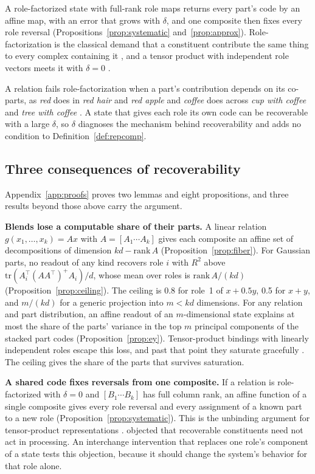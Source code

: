 \documentclass[10pt]{article}
\theoremstyle{plain}
\theoremstyle{remark}
\begin{document}
A role-factorized state with full-rank role maps returns every part's code by an affine map, with an error that grows with $\delta$, and one composite then fixes every role reversal (Propositions~\ref{prop:systematic} and~\ref{prop:approx}). Role-factorization is the classical demand that a constituent contribute the same thing to every complex containing it \citep{fodor1988}, and a tensor product with independent role vectors meets it with $\delta = 0$ \citep{smolensky1990}.

A relation fails role-factorization when a part's contribution depends on its co-parts, as \emph{red} does in \emph{red hair} and \emph{red apple} \citep{kamp1995} and \emph{coffee} does across \emph{cup with coffee} and \emph{tree with coffee} \citep{smolensky1988}. A state that gives each role its own code can be recoverable with a large $\delta$, so $\delta$ diagnoses the mechanism behind recoverability and adds no condition to Definition~\ref{def:repcomp}.

\subsection{Three consequences of recoverability}
\label{sec:consequences}

Appendix~\ref{app:proofs} proves two lemmas and eight propositions, and three results beyond those above carry the argument.

\textbf{Blends lose a computable share of their parts.} A linear relation $g(x_1, \ldots, x_k) = A x$ with $A = [A_1 \cdots A_k]$ gives each composite an affine set of decompositions of dimension $kd - \mathrm{rank}\,A$ (Proposition~\ref{prop:fiber}). For Gaussian parts, no readout of any kind recovers role $i$ with $R^2$ above $\mathrm{tr}(A_i^{\top}(AA^{\top})^{+}A_i)/d$, whose mean over roles is $\mathrm{rank}\,A/(kd)$ (Proposition~\ref{prop:ceiling}). The ceiling is 0.8 for role~1 of $x + 0.5y$, 0.5 for $x + y$, and $m/(kd)$ for a generic projection into $m < kd$ dimensions. For any relation and part distribution, an affine readout of an $m$-dimensional state explains at most the share of the parts' variance in the top $m$ principal components of the stacked part codes (Proposition~\ref{prop:ey}). Tensor-product bindings with linearly independent roles escape this loss, and past that point they saturate gracefully \citep{smolensky1990}. The ceiling gives the share of the parts that survives saturation.

\textbf{A shared code fixes reversals from one composite.} If a relation is role-factorized with $\delta = 0$ and $[B_1 \cdots B_k]$ has full column rank, an affine function of a single composite gives every role reversal and every assignment of a known part to a new role (Proposition~\ref{prop:systematic}). This is the unbinding argument for tensor-product representations \citep{smolensky1990}. \citet{fodor1990} objected that recoverable constituents need not act in processing. An interchange intervention that replaces one role's component of a state tests this objection, because it should change the system's behavior for that role alone.
\end{document}
